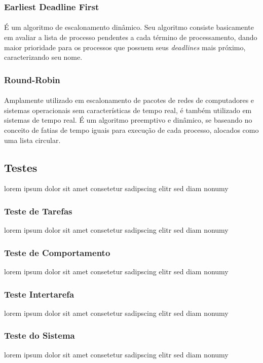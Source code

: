 \subsubsection{Earliest Deadline First}
\paragraph{}
É um algoritmo de escalonamento dinâmico. Seu algoritmo consiste basicamente em avaliar a lista de processo
pendentes a cada término de processamento, dando maior prioridade para os processos que possuem seus
\textit{deadlines} mais próximo, caracterizando seu nome.

\subsubsection{Round-Robin}
\paragraph{}
Amplamente utilizado em escalonamento de pacotes de redes de computadores e sistemas operacionais sem características
de tempo real, é também utilizado em sistemas de tempo real. É um algoritmo preemptivo e dinâmico, se baseando no
conceito de fatias de tempo iguais para execução de cada processo, alocados como uma lista circular.

\subsection{Testes}
lorem ipsum dolor sit amet consetetur sadipscing elitr sed diam nonumy

\subsubsection{Teste de Tarefas}
lorem ipsum dolor sit amet consetetur sadipscing elitr sed diam nonumy

\subsubsection{Teste de Comportamento}
lorem ipsum dolor sit amet consetetur sadipscing elitr sed diam nonumy

\subsubsection{Teste Intertarefa}
lorem ipsum dolor sit amet consetetur sadipscing elitr sed diam nonumy

\subsubsection{Teste do Sistema}
lorem ipsum dolor sit amet consetetur sadipscing elitr sed diam nonumy
